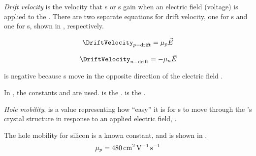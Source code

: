 \begin{definition}\label{def:Drift_Velocity}
  \emph{Drift velocity} is the velocity that s or s gain when an electric field (voltage) is applied to the .
  There are two separate equations for drift velocity, one for s and one for s, shown in , respectively.
\end{definition}

\begin{equation}\label{eq:Drift_Velocity-Hole}
  \DriftVelocity_{\HoleConcentration-\text{drift}} = \HoleMobility \EField
\end{equation}

\begin{equation}\label{eq:Drift_Velocity-Electron}
  \DriftVelocity_{\ElectronConcentration-\text{drift}} = -\ElectronMobility \EField
\end{equation}

 is negative because s move in the opposite direction of the electric field \EField{}.

In , the constants \HoleMobility{} and \ElectronMobility{} are used.
\HoleMobility{} is the .
\ElectronMobility{} is the .

\begin{definition}\label{def:Hole_Mobility}
  \emph{Hole mobility}, \HoleMobility{} is a value representing how ``easy'' it is for s to move through the 's crystal structure in response to an applied electric field, \EField{}.

  The hole mobility for  silicon is a known constant, and is shown in .
  \begin{equation}\label{eq:Hole_Mobility-Intrinsic_Silicon}
    \mu_{p} = \SI{480}{\centi\meter\squared\per\volt\per\second}
  \end{equation}
\end{definition}

